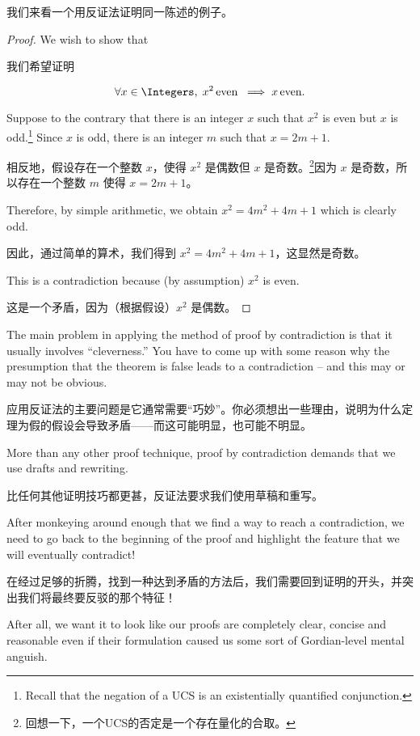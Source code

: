 我们来看一个用反证法证明同一陈述的例子。
\begin{proof}
      We wish to show that

      我们希望证明

      \[ \forall x \in \Integers, \; x^2 \, \mbox{even} \;
            \implies x \, \mbox{even}.
      \]

      Suppose to the contrary that there is an integer $x$ such that
      $x^2$ is even but $x$ is odd.\footnote{Recall that the negation of
            a UCS is an existentially quantified conjunction.}  Since $x$ is
      odd, there is an integer $m$ such that $x=2m+1$.

      相反地，假设存在一个整数 $x$，使得 $x^2$ 是偶数但 $x$ 是奇数。\footnote{回想一下，一个UCS的否定是一个存在量化的合取。}因为 $x$ 是奇数，所以存在一个整数 $m$ 使得 $x=2m+1$。

      Therefore, by
      simple arithmetic, we obtain $x^2 = 4m^2+4m+1$ which is clearly odd.

      因此，通过简单的算术，我们得到 $x^2 = 4m^2+4m+1$，这显然是奇数。

      This is a contradiction because (by assumption) $x^2$ is even.

      这是一个矛盾，因为（根据假设）$x^2$ 是偶数。
\end{proof}

The main problem in applying the method of proof by contradiction
is that it usually involves ``cleverness.''   You have to come up
with some reason why the presumption that the theorem is false leads
to a contradiction -- and this may or may not be obvious.

应用反证法的主要问题是它通常需要“巧妙”。你必须想出一些理由，说明为什么定理为假的假设会导致矛盾——而这可能明显，也可能不明显。

More than
any other proof technique, proof by contradiction demands that we use
drafts and rewriting.

比任何其他证明技巧都更甚，反证法要求我们使用草稿和重写。

After monkeying around enough that we find a
way to reach a contradiction, we need to go back to the beginning
of the proof and highlight the feature that we will eventually contradict!

在经过足够的折腾，找到一种达到矛盾的方法后，我们需要回到证明的开头，并突出我们将最终要反驳的那个特征！

After all, we want it to look like our proofs are completely clear, concise
and reasonable even if their formulation caused us some sort
of Gordian-level mental anguish.


